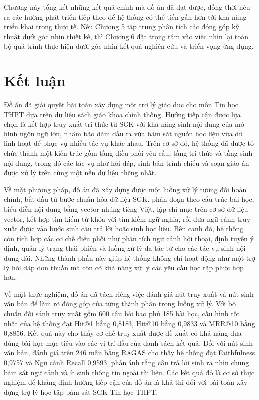 \documentclass[../DoAn.tex]{subfiles}
\begin{document}
Chương này tổng kết những kết quả chính mà đồ án đã đạt được, đồng thời nêu ra các hướng phát triển tiếp theo để hệ thống có thể tiến gần hơn tới khả năng triển khai trong thực tế. Nếu Chương 5 tập trung phân tích các đóng góp kỹ thuật dưới góc nhìn thiết kế, thì Chương 6 đặt trọng tâm vào việc nhìn lại toàn bộ quá trình thực hiện dưới góc nhìn kết quả nghiên cứu và triển vọng ứng dụng.

\section{Kết luận}

Đồ án đã giải quyết bài toán xây dựng một trợ lý giáo dục cho môn Tin học THPT dựa trên dữ liệu sách giáo khoa chính thống. Hướng tiếp cận được lựa chọn là kết hợp truy xuất tri thức từ SGK với khả năng sinh nội dung của mô hình ngôn ngữ lớn, nhằm bảo đảm đầu ra vừa bám sát nguồn học liệu vừa đủ linh hoạt để phục vụ nhiều tác vụ khác nhau. Trên cơ sở đó, hệ thống đã được tổ chức thành một kiến trúc gồm tầng điều phối yêu cầu, tầng tri thức và tầng sinh nội dung, trong đó các tác vụ như hỏi đáp, sinh bản trình chiếu và soạn giáo án được xử lý trên cùng một nền dữ liệu thống nhất.

Về mặt phương pháp, đồ án đã xây dựng được một luồng xử lý tương đối hoàn chỉnh, bắt đầu từ bước chuẩn hóa dữ liệu SGK, phân đoạn theo cấu trúc bài học, biểu diễn nội dung bằng vector nhúng tiếng Việt, lập chỉ mục trên cơ sở dữ liệu vector, kết hợp tìm kiếm từ khóa với tìm kiếm ngữ nghĩa, rồi đưa ngữ cảnh truy xuất được vào bước sinh câu trả lời hoặc sinh học liệu. Bên cạnh đó, hệ thống còn tích hợp các cơ chế điều phối như phân tích ngữ cảnh hội thoại, định tuyến ý định, quản lý trạng thái phiên và luồng xử lý đa tác tử cho các tác vụ sinh nội dung dài. Những thành phần này giúp hệ thống không chỉ hoạt động như một trợ lý hỏi đáp đơn thuần mà còn có khả năng xử lý các yêu cầu học tập phức hợp hơn.

Về mặt thực nghiệm, đồ án đã tách riêng việc đánh giá nút truy xuất và nút sinh văn bản để làm rõ đóng góp của từng thành phần trong luồng xử lý. Với bộ chuẩn đối sánh truy xuất gồm 600 câu hỏi bao phủ 185 bài học, cấu hình tốt nhất của hệ thống đạt Hit@1 bằng 0,8183, Hit@10 bằng 0,9833 và MRR@10 bằng 0,8856. Kết quả này cho thấy cơ chế truy xuất được đề xuất có khả năng đưa đúng bài học mục tiêu vào các vị trí đầu của danh sách kết quả. Đối với nút sinh văn bản, đánh giá trên 246 mẫu bằng RAGAS cho thấy hệ thống đạt Faithfulness 0,9757 và Ngữ cảnh Recall 0,9593, phản ánh rằng câu trả lời sinh ra nhìn chung bám sát ngữ cảnh và ít sinh thông tin ngoài tài liệu. Các kết quả đó là cơ sở thực nghiệm để khẳng định hướng tiếp cận của đồ án là khả thi đối với bài toán xây dựng trợ lý học tập bám sát SGK Tin học THPT.
\end{document}
